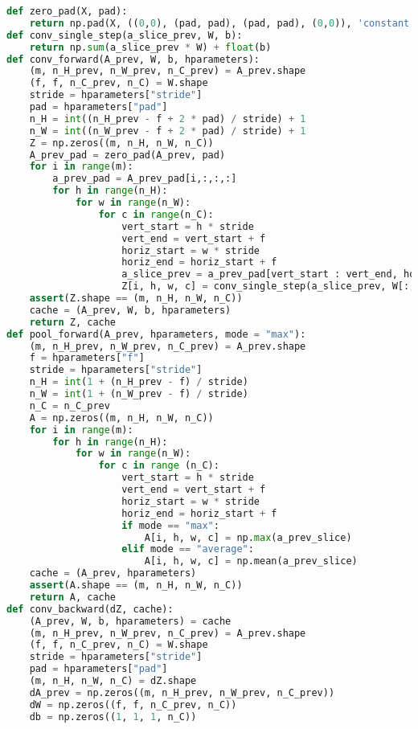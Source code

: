 \begin{lstlisting}[language=Python]
def zero_pad(X, pad):
    return np.pad(X, ((0,0), (pad, pad), (pad, pad), (0,0)), 'constant')
def conv_single_step(a_slice_prev, W, b):
    return np.sum(a_slice_prev * W) + float(b)
def conv_forward(A_prev, W, b, hparameters):
    (m, n_H_prev, n_W_prev, n_C_prev) = A_prev.shape
    (f, f, n_C_prev, n_C) = W.shape
    stride = hparameters["stride"]
    pad = hparameters["pad"]
    n_H = int((n_H_prev - f + 2 * pad) / stride) + 1
    n_W = int((n_W_prev - f + 2 * pad) / stride) + 1
    Z = np.zeros((m, n_H, n_W, n_C))
    A_prev_pad = zero_pad(A_prev, pad)
    for i in range(m):
        a_prev_pad = A_prev_pad[i,:,:,:] 
        for h in range(n_H):
            for w in range(n_W):
                for c in range(n_C):
                    vert_start = h * stride
                    vert_end = vert_start + f
                    horiz_start = w * stride
                    horiz_end = horiz_start + f
                    a_slice_prev = a_prev_pad[vert_start : vert_end, horiz_start : horiz_end, :]
                    Z[i, h, w, c] = conv_single_step(a_slice_prev, W[:, :, :, c], b[:, :, :, c])
    assert(Z.shape == (m, n_H, n_W, n_C))
    cache = (A_prev, W, b, hparameters)
    return Z, cache
def pool_forward(A_prev, hparameters, mode = "max"):
    (m, n_H_prev, n_W_prev, n_C_prev) = A_prev.shape
    f = hparameters["f"]
    stride = hparameters["stride"]
    n_H = int(1 + (n_H_prev - f) / stride)
    n_W = int(1 + (n_W_prev - f) / stride)
    n_C = n_C_prev
    A = np.zeros((m, n_H, n_W, n_C))              
    for i in range(m): 
        for h in range(n_H): 
            for w in range(n_W): 
                for c in range (n_C):
                    vert_start = h * stride
                    vert_end = vert_start + f
                    horiz_start = w * stride
                    horiz_end = horiz_start + f
                    if mode == "max":
                        A[i, h, w, c] = np.max(a_prev_slice)
                    elif mode == "average":
                        A[i, h, w, c] = np.mean(a_prev_slice)
    cache = (A_prev, hparameters)
    assert(A.shape == (m, n_H, n_W, n_C))
    return A, cache
def conv_backward(dZ, cache):
    (A_prev, W, b, hparameters) = cache
    (m, n_H_prev, n_W_prev, n_C_prev) = A_prev.shape
    (f, f, n_C_prev, n_C) = W.shape
    stride = hparameters["stride"]
    pad = hparameters["pad"]
    (m, n_H, n_W, n_C) = dZ.shape
    dA_prev = np.zeros((m, n_H_prev, n_W_prev, n_C_prev))               
    dW = np.zeros((f, f, n_C_prev, n_C))
    db = np.zeros((1, 1, 1, n_C))

\end{lstlisting}
